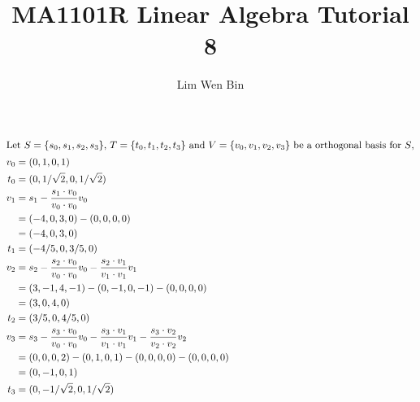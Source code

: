\documentclass[12pt]{article}
\newenvironment{problem}[2][Problem]{\begin{trivlist}
\item[\hskip \labelsep {\bfseries #1}\hskip \labelsep {\bfseries #2.}]}{\end{trivlist}}
\begin{document}
\title{MA1101R Linear Algebra Tutorial 8}
\author{Lim Wen Bin}
\maketitle
 
\begin{problem}{1.a}
\end{problem}
\begin{align*}
\intertext{Let $S = \{s_0, s_1, s_2, s_3\}$, $T = \{t_0, t_1, t_2, t_3\}$ and $V = \{v_0, v_1, v_2, v_3\}$ be a orthogonal basis for $S$,}
v_0 &= (0, 1, 0, 1)\\
t_0 &= (0, 1/\sqrt{2}, 0, 1/\sqrt{2}) \\
v_1 &= s_1 - \frac{s_1 \cdot v_0}{v_0 \cdot v_0}v_0\\
&= (-4, 0, 3, 0) - (0, 0, 0, 0)\\
&= (-4, 0, 3, 0) \\
t_1 &= (-4/5, 0, 3/5, 0)\\ 
v_2 &= s_2 - \frac{s_2 \cdot v_0}{v_0 \cdot v_0}v_0 - \frac{s_2 \cdot v_1}{v_1 \cdot v_1}v_1 \\
&= (3, -1, 4, -1) - (0, -1, 0 , -1) - (0, 0, 0, 0)\\
&= (3, 0, 4, 0)\\
t_2 &= (3/5, 0, 4/5, 0)\\
v_3 &=  s_3 - \frac{s_3 \cdot v_0}{v_0 \cdot v_0}v_0 - \frac{s_3 \cdot v_1}{v_1 \cdot v_1}v_1 - \frac{s_3 \cdot v_2}{v_2 \cdot v_2}v_2 \\
&= (0, 0, 0, 2) - (0, 1, 0, 1) - (0 , 0, 0, 0)- (0 , 0, 0, 0)\\
&= (0, -1, 0, 1)\\
t_3 &= (0, -1/\sqrt{2}, 0, 1/\sqrt{2}) \\
\end{align*}
\end{document}

